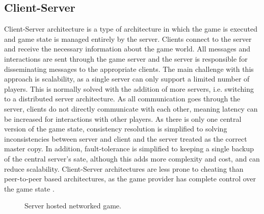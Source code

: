 \subsection{Client-Server}
Client-Server architecture is a type of architecture in which the game is executed and game state is managed entirely by the server. Clients connect to the server and receive the necessary information about the game world. All messages and interactions are sent through the game server and the server is responsible for disseminating messages to the appropriate clients. The main challenge with this approach is scalability, as a single server can only support a limited number of players. This is normally solved with the addition of more servers, i.e. switching to a distributed server architecture. As all communication goes through the server, clients do not directly communicate with each other, meaning latency can be increased for interactions with other players.
As there is only one central version of the game state, consistency resolution is simplified to solving inconsistencies between server and client and the server treated as the correct master copy. In addition, fault-tolerance is simplified to keeping a single backup of the central server's sate, although this adds more complexity and cost, and can reduce scalability. Client-Server architectures are less prone to cheating than peer-to-peer based architectures, as the game provider has complete control over the game state \cite{P2PSurvey}.

\begin{figure}
	\centering
	
	\caption{Server hosted networked game.}
\end{figure}

%
%	

